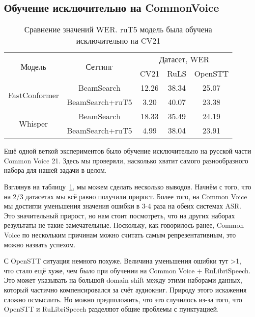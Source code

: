 \subsection{Обучение исключительно на CommonVoice}
\begin{table}[]
\centering
\caption{Сравнение значений WER. ruT5 модель была обучена исключительно на CV21}
\begin{tabular}{|c|c|ccc|}
\hline
\multirow{2}{*}{Модель}        & \multirow{2}{*}{Сеттинг}             & \multicolumn{3}{c|}{Датасет, WER}                                    \\ \cline{3-5} 
                               &                                      & \multicolumn{1}{c|}{CV21}  & \multicolumn{1}{c|}{RuLS}     & OpenSTT \\ \hline
\multirow{2}{*}{FastConformer} & BeamSearch                           & \multicolumn{1}{c|}{12.26} & \multicolumn{1}{c|}{38.34}    & 25.07   \\ \cline{2-5} 
                               & BeamSearch+ruT5                      & \multicolumn{1}{c|}{3.20}  & \multicolumn{1}{c|}{40.07}    & 23.38   \\ \hline
\multirow{2}{*}{Whisper}       & BeamSearch                           & \multicolumn{1}{c|}{18.33} & \multicolumn{1}{c|}{35.49}    & 24.19   \\ \cline{2-5} 
                               & BeamSearch+ruT5                      & \multicolumn{1}{c|}{4.99}  & \multicolumn{1}{c|}{38.04}    & 23.91   \\ \hline
\end{tabular}
\label{tab:res_cv_trained}
\end{table}

Ещё одной веткой экспериментов было обучение исключительно на русской части Common Voice 21.
Здесь мы проверяли, насколько хватит самого разнообразного набора для нашей задачи в целом.

Взглянув на таблицу~\ref{tab:res_cv_trained}, мы можем сделать несколько выводов.
Начнём с того, что на 2/3 датасетах мы всё равно получили прирост.
Более того, на Common Voice мы достигли уменьшения значения ошибки в 3-4 раза на обеих системах ASR.
Это значительный прирост, но нам стоит посмотреть, что на других наборах результаты не такие замечательные.
Поскольку, как говорилось ранее, Common Voice по нескольким причинам можно считать самым репрезентативным, это можно назвать успехом.

С OpenSTT ситуация немного похуже.
Величина уменьшения ошибки тут >1, что стало ещё хуже, чем было при обучении на Common Voice + RuLibriSpeech.
Это может указывать на большой domain shift между этими наборами данных, который частично компенсировался за счёт аудиокниг.
Природу этого искажения сложно осмыслить.
Но можно предположить, что это случилось из-за того, что OpenSTT и RuLibriSpeech разделяют общие проблемы с пунктуацией.

